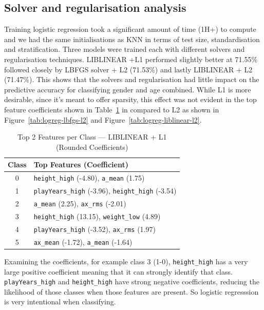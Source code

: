 \documentclass[10pt,twocolumn]{article}
\begin{document}
\subsection{Solver and regularisation analysis}
Training logistic regression took a significant amount of time (1H+) to compute and we had the same initialisations as KNN in terms of test size, standardisation and stratification. Three models were trained each with different solvers and regularisation  techniques. LIBLINEAR +L1 performed slightly better at 71.55\% followed closely by LBFGS solver + L2 (71.53\%) and lastly LIBLINEAR + L2 (71.47\%). This shows that the solvers and regularisation had little impact on the predictive accuracy for classifying gender and age combined. While L1 is more desirable, since it's meant to offer sparsity, this effect was not evident in the top feature coefficients shown in Table~\ref{tab:logreg-liblinear-l1} in compared to L2 as shown in Figure~\ref{tab:logreg-lbfgs-l2} and Figure~\ref{tab:logreg-liblinear-l2}.
\begin{table}[H]
\centering
\footnotesize
\caption{Top 2 Features per Class — LIBLINEAR + L1 (Rounded Coefficients)}
\begin{tabular}{|c|p{6.5cm}|}
\hline
\textbf{Class} & \textbf{Top Features (Coefficient)} \\
\hline
0 & \texttt{height\_high} (-4.80), \texttt{a\_mean} (1.75) \\
1 & \texttt{playYears\_high} (-3.96), \texttt{height\_high} (-3.54) \\
2 & \texttt{a\_mean} (2.25), \texttt{ax\_rms} (-2.01) \\
3 & \texttt{height\_high} (13.15), \texttt{weight\_low} (4.89) \\
4 & \texttt{playYears\_high} (-3.52), \texttt{ax\_rms} (1.97) \\
5 & \texttt{ax\_mean} (-1.72), \texttt{a\_mean} (-1.64) \\
\hline
\end{tabular}
\label{tab:logreg-liblinear-l1}
\end{table}
\clearpage
Examining the coefficients, for example class 3 (1-0), \texttt{height\_high} has a very large positive coefficient meaning that it can strongly identify that class. \texttt{playYears\_high} and \texttt{height\_high} have strong negative coefficients, reducing the likelihood of those classes when those features are present. So logistic regresssion is very intentional when classifying.
\end{document}

